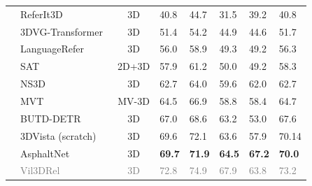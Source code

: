 \documentclass[10pt,twocolumn,letterpaper]{article}
\begin{document}
\begin{table}[t]
\begin{tabular}{|c|l|c|x{1.2cm}|x{1.3cm} x{1.1cm} x{1.1cm} x{1.3cm}|}
\hline
\hline
{} & ReferIt3D~\cite{achlioptas2020referit_3d}  &3D & 40.8 & 44.7 & 31.5 & 39.2 & 40.8 \\
& 3DVG-Transformer~\cite{zhao2021_3DVG_Transformer} &  3D &  51.4 & 54.2 & 44.9 & 44.6 & 51.7 \\
& LanguageRefer~\cite{roh2022languagerefer} & 3D &  56.0 & 58.9 & 49.3 & 49.2 & 56.3 \\
& SAT~\cite{yang2021sat} & 2D+3D &  57.9 & 61.2 & 50.0 & 49.2 & 58.3 \\
& NS3D~\cite{hsu2023ns3d} & 3D& 62.7 & 64.0 & 59.6 & 62.0 & 62.7 \\
& MVT~\cite{huang2022multiview}& MV-3D &  64.5 & 66.9 & 58.8 & 58.4 & 64.7 \\
& BUTD-DETR~\cite{jain2022bottom}  &3D &  67.0 & 68.6 & 63.2 & 53.0 & 67.6 \\
  & 3DVista (scratch) & 3D & 69.6 & 72.1 & 63.6 & 57.9&  70.14 \\

& AsphaltNet & 3D &  \textbf{69.7} & \textbf{71.9} & \textbf{64.5} & \textbf{67.2} & \textbf{70.0}\\

& \textcolor{gray}{Vil3DRel~\cite{chen2022language}} & \textcolor{gray}{3D} & \textcolor{gray}{72.8} & \textcolor{gray}{74.9} & \textcolor{gray}{67.9} & 	\textcolor{gray}{63.8} &	\textcolor{gray}{73.2}\\


\end{tabular}
\end{table}
\end{document}

